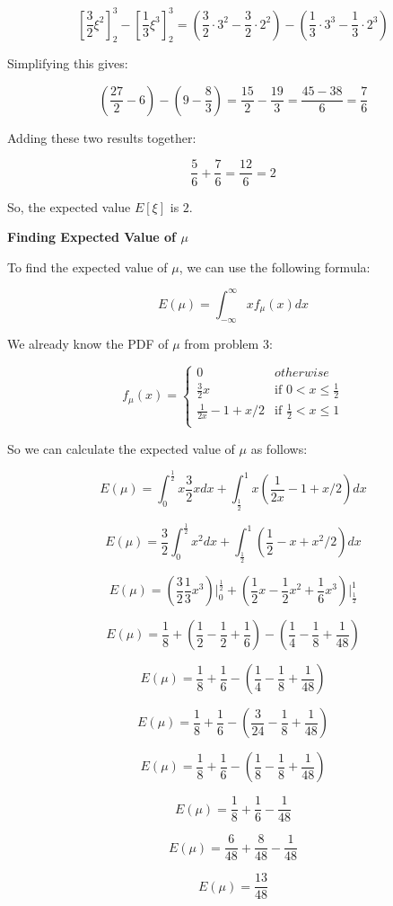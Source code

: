 \[
    \left[\frac{3}{2}\xi^2\right]_{2}^{3} - \left[\frac{1}{3}\xi^3\right]_{2}^{3} = \left(\frac{3}{2} \cdot 3^2 - \frac{3}{2} \cdot 2^2\right) - \left(\frac{1}{3} \cdot 3^3 - \frac{1}{3} \cdot 2^3\right)
\]

Simplifying this gives:

\[
    \left(\frac{27}{2} - 6\right) - \left(9 - \frac{8}{3}\right) = \frac{15}{2} - \frac{19}{3} = \frac{45 - 38}{6} = \frac{7}{6}
\]

Adding these two results together:

\[
    \frac{5}{6} + \frac{7}{6} = \frac{12}{6} = 2
\]

So, the expected value \(E[\xi]\) is \(2\).

\textbf{Finding Expected Value of $\mu$}

To find the expected value of $\mu$, we can use the following formula:

\[ E(\mu) = \int_{-\infty}^{\infty} x f_{\mu}(x) dx \]

We already know the PDF of $\mu$ from problem 3:

\[ f_{\mu}(x) = \begin{cases}
        0                      & otherwise                         \\
        \frac{3}{2}x           & \text{if } 0 < x \leq \frac{1}{2} \\
        \frac{1}{2x} - 1 + x/2 & \text{if } \frac{1}{2} < x \leq 1 \\
    \end{cases} \]


So we can calculate the expected value of $\mu$ as follows:

\[ E(\mu) = \int_{0}^{\frac{1}{2}} x \frac{3}{2}x dx + \int_{\frac{1}{2}}^{1} x (\frac{1}{2x} - 1 + x/2) dx \]

\[ E(\mu) = \frac{3}{2} \int_{0}^{\frac{1}{2}} x^2 dx + \int_{\frac{1}{2}}^{1} (\frac{1}{2} - x + x^2/2) dx \]

\[ E(\mu) = (\frac{3}{2} \frac{1}{3} x^3 )\Big|_{0}^{\frac{1}{2}} + (\frac{1}{2} x - \frac{1}{2} x^2 + \frac{1}{6} x^3 )\Big|_{\frac{1}{2}}^{1} \]

\[ E(\mu) = \frac{1}{8} + \left(\frac{1}{2} - \frac{1}{2} + \frac{1}{6}\right) - \left(\frac{1}{4} - \frac{1}{8} + \frac{1}{48}\right) \]


\[ E(\mu) = \frac{1}{8} + \frac{1}{6} - \left(\frac{1}{4} - \frac{1}{8} + \frac{1}{48}\right) \]

\[ E(\mu) = \frac{1}{8} + \frac{1}{6} - \left(\frac{3}{24} - \frac{1}{8} + \frac{1}{48}\right) \]

\[ E(\mu) = \frac{1}{8} + \frac{1}{6} - \left(\frac{1}{8} - \frac{1}{8} + \frac{1}{48}\right) \]

\[ E(\mu) = \frac{1}{8} + \frac{1}{6} - \frac{1}{48} \]

\[ E(\mu) = \frac{6}{48} + \frac{8}{48} - \frac{1}{48} \]

\[ E(\mu) = \frac{13}{48} \]